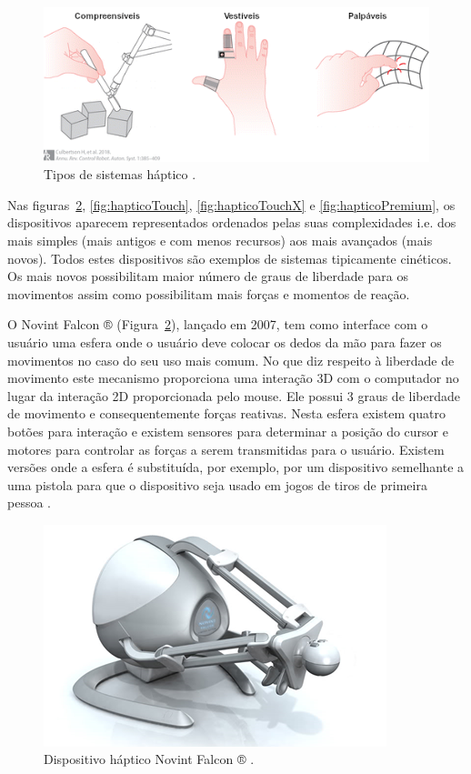 \begin{figure}[ht!]
    \centering
    \includegraphics[width=0.8\linewidth]{capitulos/figuras/tipos.hapticos-portugues.png}
    \caption{Tipos de sistemas háptico \cite{Culbertson2018}.}
    \label{fig:tiposHapticos}
\end{figure}

Nas figuras~\ref{fig:hapticoNovintFalcon}, \ref{fig:hapticoTouch}, \ref{fig:hapticoTouchX} e  \ref{fig:hapticoPremium}, os dispositivos aparecem representados ordenados pelas suas complexidades i.e. dos mais simples (mais antigos e com menos recursos) aos mais avançados (mais novos). Todos estes dispositivos são exemplos de sistemas tipicamente cinéticos. Os mais novos possibilitam maior número de graus de liberdade para os movimentos assim como possibilitam mais forças e momentos de reação. 

O Novint Falcon ® (Figura~\ref{fig:hapticoNovintFalcon}), lançado em 2007, tem como interface com o usuário uma esfera onde o usuário deve colocar os dedos da mão para fazer os movimentos no caso do seu uso mais comum. No que diz respeito à liberdade de movimento este mecanismo proporciona uma interação 3D com o computador no lugar da interação 2D proporcionada pelo mouse. Ele possui 3 graus de liberdade de movimento e consequentemente forças reativas. Nesta esfera existem quatro botões para interação e existem sensores para determinar a posição do cursor e motores para controlar as forças a serem transmitidas para o usuário. Existem versões onde a esfera é substituída, por exemplo, por um dispositivo semelhante a uma pistola para que o dispositivo seja usado em jogos de tiros de primeira pessoa \cite{VRS2017}. 

\begin{figure}[ht!]
    \centering
    \includegraphics[width=0.4\linewidth]{capitulos/figuras/hapticoNovintFalcon.png}
    \caption{Dispositivo háptico Novint Falcon ® \cite{HAPTICSHOUSE2019}
    \label{fig:hapticoNovintFalcon}.}
\end{figure}

